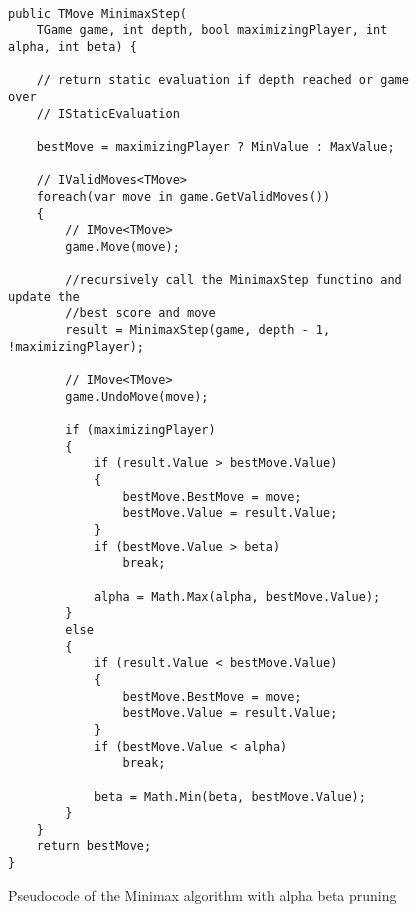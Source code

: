\begin{figure}[h]
\captionsetup{justification=centering}
\begin{lstlisting}

public TMove MinimaxStep(
    TGame game, int depth, bool maximizingPlayer, int alpha, int beta) {
    
    // return static evaluation if depth reached or game over
    // IStaticEvaluation

    bestMove = maximizingPlayer ? MinValue : MaxValue;
    
    // IValidMoves<TMove>
    foreach(var move in game.GetValidMoves())
    {
        // IMove<TMove>
        game.Move(move);

        //recursively call the MinimaxStep functino and update the
        //best score and move
        result = MinimaxStep(game, depth - 1, !maximizingPlayer);
        
        // IMove<TMove>
        game.UndoMove(move);

        if (maximizingPlayer)
        {
            if (result.Value > bestMove.Value)
            {
                bestMove.BestMove = move;
                bestMove.Value = result.Value;
            }
            if (bestMove.Value > beta)
                break;

            alpha = Math.Max(alpha, bestMove.Value);
        }
        else
        {
            if (result.Value < bestMove.Value)
            {
                bestMove.BestMove = move;
                bestMove.Value = result.Value;
            }
            if (bestMove.Value < alpha)
                break;

            beta = Math.Min(beta, bestMove.Value);
        }
    }
    return bestMove;
}
\end{lstlisting}
\caption{Pseudocode of the Minimax algorithm with alpha beta pruning}
\label{fig:minimaxABPruning}
\end{figure}


